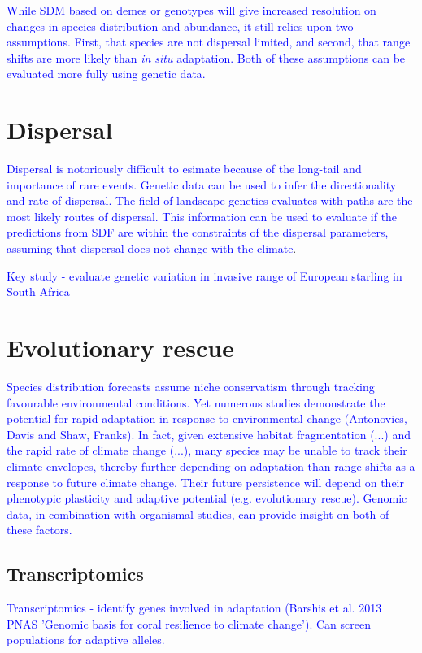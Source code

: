 \documentclass{article}
\newcommand{\Jtxt}[1]{\textcolor{blue}{#1}}
\begin{document}
\Jtxt{While SDM based on demes or genotypes will give increased resolution on changes in species distribution and abundance, it still relies upon two assumptions. First, that species are not dispersal limited, and second, that range shifts are more likely than \emph{in situ} adaptation. Both of these assumptions can be evaluated more fully using genetic data.} 

\section*{Dispersal}

\Jtxt{Dispersal is notoriously difficult to esimate because of the long-tail and importance of rare events. Genetic data can be used to infer the directionality and rate of dispersal. The field of landscape genetics evaluates with paths are the most likely routes of dispersal. This information can be used to evaluate if the predictions from SDF are within the constraints of the dispersal parameters, assuming that dispersal does not change with the climate}.

\Jtxt{Key study - \textcite{berthouly-salazar2013} evaluate genetic variation in invasive range of European starling in South Africa }

\section*{Evolutionary rescue}

\Jtxt{Species distribution forecasts assume niche conservatism through tracking favourable environmental conditions. Yet numerous studies demonstrate the potential for rapid adaptation in response to environmental change (Antonovics, Davis and Shaw, Franks). In fact, given extensive habitat fragmentation (...) and the rapid rate of climate change (...), many species may be unable to track their climate envelopes, thereby further depending on adaptation than range shifts as a response to future climate change. Their future persistence will depend on their phenotypic plasticity and adaptive potential (e.g. evolutionary rescue). Genomic data, in combination with organismal studies, can provide insight on both of these factors.}

\subsection*{Transcriptomics}

\Jtxt{Transcriptomics - identify genes involved in adaptation (Barshis et al. 2013 PNAS 'Genomic basis for coral resilience to climate change'). Can screen populations for adaptive alleles.}
\end{document}
